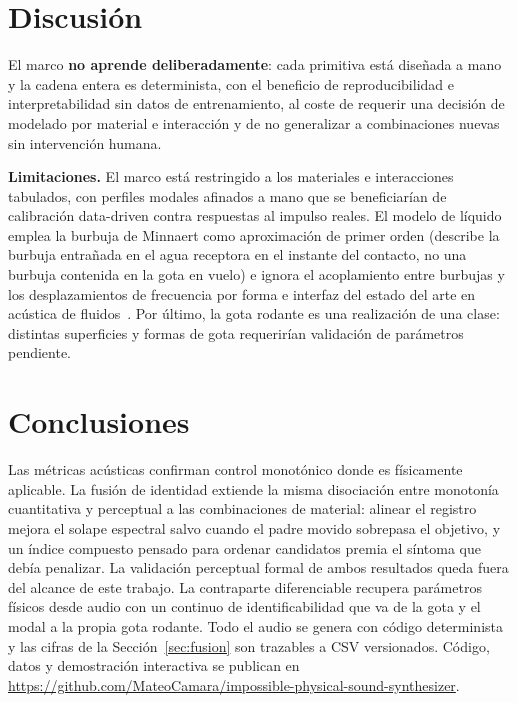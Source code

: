 \documentclass[a4paper,11pt,twoside]{article}
\begin{document}
\section{Discusión}

El marco \textbf{no aprende deliberadamente}: cada primitiva está diseñada a mano y la cadena entera es determinista, con el beneficio de reproducibilidad e interpretabilidad sin datos de entrenamiento, al coste de requerir una decisión de modelado por material e interacción y de no generalizar a combinaciones nuevas sin intervención humana.

\textbf{Limitaciones.} El marco está restringido a los materiales e interacciones tabulados, con perfiles modales afinados a mano que se beneficiarían de calibración data-driven contra respuestas al impulso reales. El modelo de líquido emplea la burbuja de Minnaert como aproximación de primer orden (describe la burbuja entrañada en el agua receptora en el instante del contacto, no una burbuja contenida en la gota en vuelo) e ignora el acoplamiento entre burbujas y los desplazamientos de frecuencia por forma e interfaz del estado del arte en acústica de fluidos~\cite{xue2023coupled}. Por último, la gota rodante es una realización de una clase: distintas superficies y formas de gota requerirían validación de parámetros pendiente.

\section{Conclusiones}

Las métricas acústicas confirman control monotónico donde es físicamente aplicable. La fusión de identidad extiende la misma disociación entre monotonía cuantitativa y perceptual a las combinaciones de material: alinear el registro mejora el solape espectral salvo cuando el padre movido sobrepasa el objetivo, y un índice compuesto pensado para ordenar candidatos premia el síntoma que debía penalizar. La validación perceptual formal de ambos resultados queda fuera del alcance de este trabajo. La contraparte diferenciable recupera parámetros físicos desde audio con un continuo de identificabilidad que va de la gota y el modal a la propia gota rodante. Todo el audio se genera con código determinista y las cifras de la Sección~\ref{sec:fusion} son trazables a CSV versionados. Código, datos y demostración interactiva se publican en \url{https://github.com/MateoCamara/impossible-physical-sound-synthesizer}.
\end{document}
